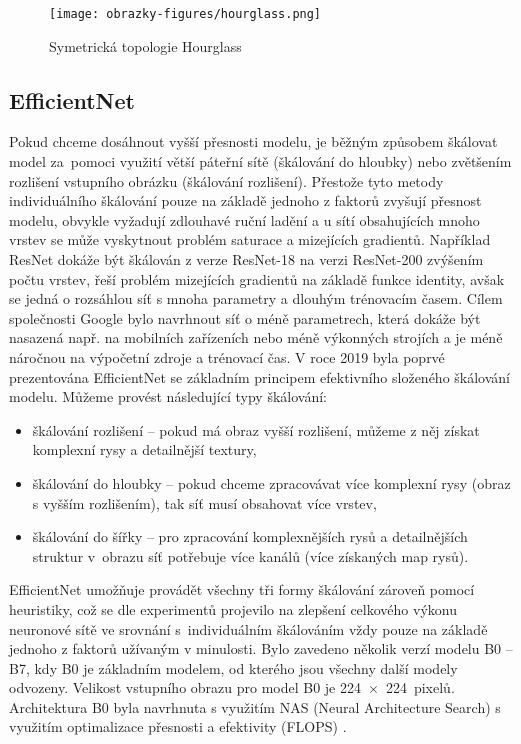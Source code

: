 \begin{figure}[!htbp]
    \centering
    \texttt{[image: obrazky-figures/hourglass.png]}
    \caption{Symetrická topologie Hourglass \cite{Hourglass}}
    \label{fig:hourglass}
\end{figure}
\subsection{EfficientNet}
Pokud chceme dosáhnout vyšší přesnosti modelu, je běžným způsobem škálovat model za~pomoci využití větší páteřní sítě (škálování do hloubky) nebo zvětšením rozlišení vstupního obrázku (škálování rozlišení). Přestože tyto metody individuálního škálování pouze na základě jednoho z faktorů zvyšují přesnost modelu, obvykle vyžadují zdlouhavé ruční ladění a u sítí obsahujících mnoho vrstev se může vyskytnout problém saturace a mizejících gradientů. Například ResNet dokáže být škálován z verze ResNet-18 na verzi ResNet-200 zvýšením počtu vrstev, řeší problém mizejících gradientů na základě funkce identity, avšak se jedná o rozsáhlou síť s mnoha parametry a dlouhým trénovacím časem. Cílem společnosti Google bylo navrhnout síť o méně parametrech, která dokáže být nasazená např. na mobilních zařízeních nebo méně výkonných strojích a  je méně náročnou na výpočetní zdroje a trénovací čas. V roce 2019 byla poprvé prezentována EfficientNet se základním principem efektivního složeného škálování modelu. Můžeme provést následující typy škálování:
\begin{itemize}
    \item škálování rozlišení -- pokud má obraz vyšší rozlišení, můžeme z něj získat komplexní rysy a detailnější textury,
    \item škálování do hloubky -- pokud chceme zpracovávat více komplexní rysy (obraz s vyšším rozlišením), tak síť musí obsahovat více vrstev,
    \item škálování do šířky -- pro zpracování komplexnějších rysů a detailnějších struktur v~obrazu síť potřebuje více kanálů (více získaných map rysů).
\end{itemize}

EfficientNet umožňuje provádět všechny tři formy škálování zároveň pomocí heuristiky, což se dle experimentů projevilo na zlepšení celkového výkonu neuronové sítě ve srovnání s~individuálním škálováním vždy pouze na základě jednoho z faktorů užívaným v minulosti.  Bylo zavedeno několik verzí modelu B0 -- B7, kdy B0 je základním modelem, od kterého jsou všechny další modely odvozeny. Velikost vstupního obrazu pro model B0 je 224~$\times$~224~pixelů. Architektura B0 byla navrhnuta s využitím NAS (Neural Architecture Search) s využitím optimalizace přesnosti a efektivity (FLOPS) \cite{EfficientNet, EfficientNetBlog}.

